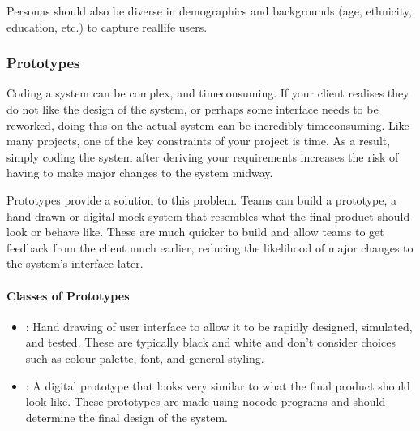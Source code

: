 \documentclass[letterpaper,10pt,english]{jupyterBook}
\begin{document}
\sphinxAtStartPar
Personas should also be diverse in demographics and backgrounds (age,
ethnicity, education, etc.) to capture real\sphinxhyphen{}life users.


\subsubsection{Prototypes}
\label{\detokenize{chapter_8/requirements_elicitation:prototypes}}
\sphinxAtStartPar
Coding a system can be complex, and time\sphinxhyphen{}consuming. If your client
realises they do not like the design of the system, or perhaps some
interface needs to be reworked, doing this on the actual system can be
incredibly time\sphinxhyphen{}consuming. Like many projects, one of the key
constraints of your project is time. As a result, simply coding the
system after deriving your requirements increases the risk of having to
make major changes to the system midway.

\sphinxAtStartPar
Prototypes provide a solution to this problem. Teams can build a
prototype, a hand drawn or digital mock system that resembles what the
final product should look or behave like. These are much quicker to
build and allow teams to get feedback from the client much earlier,
reducing the likelihood of major changes to the system’s interface
later.


\paragraph{Classes of Prototypes}
\label{\detokenize{chapter_8/requirements_elicitation:classes-of-prototypes}}\begin{itemize}
\item {} 
\sphinxAtStartPar
{}: Hand drawing of user
interface to allow it to be rapidly designed, simulated, and tested.
These are typically black and white and don’t consider choices such as
colour palette, font, and general styling.

\item {} 
\sphinxAtStartPar
{}: A digital prototype that looks very similar
to what the final product should look like. These prototypes are made
using no\sphinxhyphen{}code programs and should determine the final design of the
system.

\end{itemize}
\end{document}
